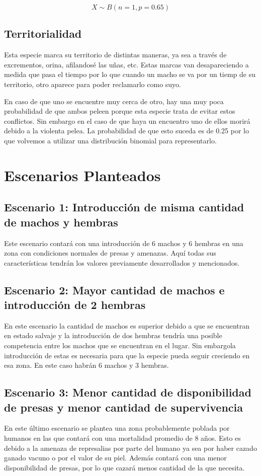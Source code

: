 \documentclass{article}
\begin{document}
        \begin{equation}
            X \sim B(n=1, p=0.65)
        \end{equation}

    \subsection{Territorialidad}
        Esta especie marca su territorio de distintas maneras, ya sea a través de excrementos, orina, afilandosé las uñas, etc. Estas marcas van desapareciendo a medida que pasa el tiempo por lo que cuando un macho se va por un tiemp de su territorio, otro aparece para poder reclamarlo como suyo.
        
        En caso de que uno se encuentre muy cerca de otro, hay una muy poca probabilidad de que ambos peleen porque esta especie trata de evitar estos conflictos. Sin embargo en el caso de que haya un encuentro uno de ellos morirá debido a la violenta pelea.
        La probabilidad de que esto suceda es de 0.25 por lo que volvemos a utilizar una distribución binomial para representarlo.
        
\section{Escenarios Planteados}
    \subsection{Escenario 1: Introducción de misma cantidad de machos y hembras}
        Este escenario contará con una introducción de 6 machos y 6 hembras en una zona con condiciones normales de presas y amenazas. Aquí todas sus características tendrán los valores previamente desarrollados y mencionados.
        
    \subsection{Escenario 2: Mayor cantidad de machos e introducción de 2 hembras}
        En este escenario la cantidad de machos es superior debido a que se encuentran en estado salvaje y la introducción de dos hembras tendría una posible competencia entre los machos que se encuentran en el lugar. Sin embargola introducción de estas es necesaria para que la especie pueda seguir creciendo en esa zona. En este caso habrán 6 machos y 3 hembras.
        
    \subsection{Escenario 3: Menor cantidad de disponibilidad de presas y menor cantidad de supervivencia}
        En este último escenario se plantea una zona probablemente poblada por humanos en las que contará con una mortalidad promedio de 8 años. Esto es debido a la amenaza de represalias por parte del humano ya sea por haber cazado ganado vacuno o por el valor de su piel. Además contará con una menor disponibilidad de presas, por lo que cazará menos cantidad de la que necesita.
    
\end{document}
